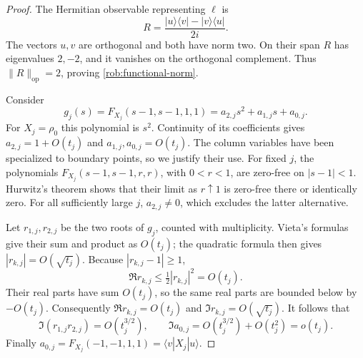 \documentclass[reqno]{amsart}
\theoremstyle{definition}
\theoremstyle{remark}
\begin{document}
\begin{proof}
The Hermitian observable representing $\ell$ is
\[
 R=\frac{|u\rangle\langle v|-|v\rangle\langle u|}{2i}.
\]
The vectors $u,v$ are orthogonal and both have norm two.  On their span
$R$ has eigenvalues $2,-2$, and it vanishes on the orthogonal
complement.  Thus $\|R\|_{\mathrm{op}}=2$, proving
\eqref{rob:functional-norm}.

Consider
\[
 g_j(s)=F_{X_j}(s-1,s-1,1,1)
       =a_{2,j}s^2+a_{1,j}s+a_{0,j}.
\]
For $X_j=\rho_0$ this polynomial is $s^2$.  Continuity of its
coefficients gives $a_{2,j}=1+O(t_j)$ and
$a_{1,j},a_{0,j}=O(t_j)$.  The column variables have been specialized
to boundary points, so we justify their use.  For fixed $j$, the
polynomials $F_{X_j}(s-1,s-1,r,r)$, with $0<r<1$, are zero-free on
$|s-1|<1$.  Hurwitz's theorem shows that their limit as $r\uparrow1$
is zero-free there or identically zero.  For all sufficiently large
$j$, $a_{2,j}\ne0$, which excludes the latter alternative.

Let $r_{1,j},r_{2,j}$ be the two roots of $g_j$, counted with
multiplicity.  Vieta's formulas give their sum and product as $O(t_j)$;
the quadratic formula then gives $|r_{k,j}|=O(\sqrt{t_j})$.
Because $|r_{k,j}-1|\geq1$,
\[
 \Re r_{k,j}\leq\tfrac12|r_{k,j}|^2=O(t_j).
\]
Their real parts have sum $O(t_j)$, so the same real parts are bounded
below by $-O(t_j)$.  Consequently
$\Re r_{k,j}=O(t_j)$ and $\Im r_{k,j}=O(\sqrt{t_j})$.
It follows that
\[
 \Im(r_{1,j}r_{2,j})=O(t_j^{3/2}),\qquad
 \Im a_{0,j}=O(t_j^{3/2})+O(t_j^2)=o(t_j).
\]
Finally $a_{0,j}=F_{X_j}(-1,-1,1,1)=\langle v|X_j|u\rangle$.
\end{proof}
\end{document}
